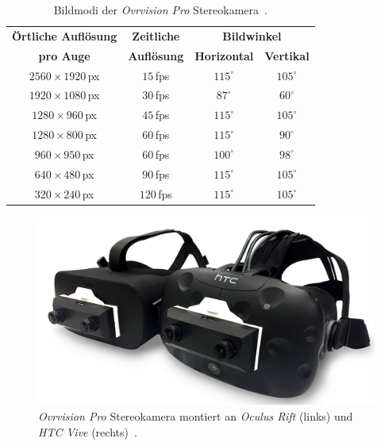 \begin{table}
	\centering
	\begin{tabular}{|c|c|c|c|}
		\hline
		\Absatzbox{}
		\textbf{Örtliche Auflösung}& \textbf{Zeitliche} & \multicolumn{2}{c|}{\textbf{Bildwinkel}}\\
		\cline{3-4}
		\Absatzbox{}
		\textbf{pro Auge}& \textbf{Auflösung} & \textbf{Horizontal} & \textbf{Vertikal}\\
		\hline
		$2560\times1920$\,px & $15$\,fps & $115^\circ$ & $105^\circ$\\
		\hline
		$1920\times1080$\,px & $30$\,fps & $87^\circ$ & $60^\circ$\\
		\hline
		$1280\times960$\,px & $45$\,fps & $115^\circ$ & $105^\circ$\\
		\hline
		$1280\times800$\,px & $60$\,fps & $115^\circ$ & $90^\circ$\\
		\hline
		$960\times950$\,px & $60$\,fps & $100^\circ$ & $98^\circ$\\
		\hline
		$640\times480$\,px & $90$\,fps & $115^\circ$ & $105^\circ$\\
		\hline
		$320\times240$\,px & $120$\,fps & $115^\circ$ & $105^\circ$\\
		\hline
	\end{tabular}
	\caption[Bildmodi der \emph{Ovrvision Pro} Stereokamera]{Bildmodi der \emph{Ovrvision Pro} Stereokamera~\cite{website:ovrvisionProduct}.}
	\label{tab:ovrRes}
\end{table}

\begin{figure}[H]
	\centering
	\includegraphics[width=\textwidth]{Bilder/ovr.jpg}			
		\caption[\emph{Ovrvision Pro} Stereokamera]{\emph{Ovrvision Pro} Stereokamera montiert an \emph{Oculus Rift} (links) und \emph{HTC Vive} (rechts)~\cite{website:ovrvision}.}
		\label{fig:ovr}
\end{figure}


